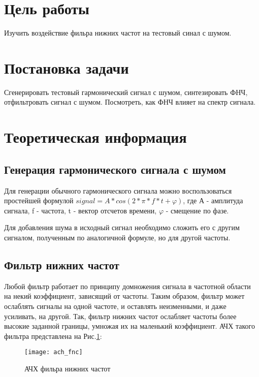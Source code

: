 







\section{Цель работы}
Изучить воздействие фильра нижних частот на тестовый синал с шумом.

\section{Постановка задачи}
Сгенерировать тестовый гармонический сигнал с шумом, синтезировать ФНЧ, отфильтровать сигнал с шумом. Посмотреть, как ФНЧ влияет на спектр сигнала.

\section{Теоретическая информация}
\subsection{Генерация гармонического сигнала с шумом}
Для генерации обычного гармонического сигнала можно воспользоваться простейшей формулой $signal = A*cos(2*\pi * f*t + \varphi)$, где А - амплитуда сигнала, f - частота, t - вектор отсчетов времени, $\varphi$ - смещение по фазе.

Для добавления шума в исходный сигнал необходимо сложить его с другим сигналом, полученным по аналогичной формуле, но для другой частоты.

\subsection{Фильтр нижних частот}
Любой фильтр работает по принципу домножения сигнала в частотной области на некий коэффициент, зависящий от частоты. Таким образом, фильтр может ослаблять сигналы на одной частоте, и  оставлять неизменными, и даже усиливать, на другой. Так, фильтр нижних частот ослабляет частоты более высокие заданной границы, умножая их на маленький коэффициент. АЧХ такого фильтра представлена на Рис.\ref{pic:ach_fnc}:
\begin{figure}[H]
	\begin{center}
		\texttt{[image: ach\_fnc]}
		\caption{АЧХ фильра нижних частот} 
		\label{pic:ach_fnc} %
	\end{center}
\end{figure}

